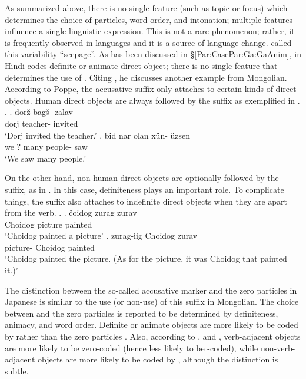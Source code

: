 As summarized above,
there is no single feature (such as topic or focus) which determines
the choice of particles, word order, and intonation;
multiple features influence a single linguistic expression.
This is not a rare phenomenon;
rather, it is frequently observed in languages and
it is a source of language change.
 called this variability ``seepage''.
As has been discussed in \S \ref{Par:CasePar:Ga:GaAnim},
 in Hindi codes definite or animate direct object;
there is no single feature that determines the use of .
Citing \cite{poppe70}, he discusses another example from Mongolian.
According to Poppe, the accusative suffix  only attaches to certain kinds of direct objects.
Human direct objects are always followed by the suffix as exemplified in
\Next.
%
\ex.\label{Disc:Ex:Mongolian1}
 \ag. dor\v{z} bag\v{s}- zalav \\
	dorj teacher-{} invited \\
	`Dorj invited the teacher.'
 \bg. bid nar olan x\"{u}n- \"{u}zsen \\
	we ? many people-{} saw \\
	`We saw many people.'
	\hfill{\cite[18]{comrie79}}

On the other hand, non-human direct objects are optionally followed by the suffix, as in \Next.
In this case,
definiteness plays an important role.
To complicate things,
the suffix also attaches to indefinite direct objects
when they are apart from the verb.
%
\ex.\label{Disc:Ex:Mongolian2}
 \ag. \v{c}oidog zurag zurav \\
	Choidog picture painted \\
	`Choidog painted a picture'
 \bg. zurag-iig Choidog zurav \\
	picture- Choidog painted \\
	`Choidog painted the picture. (As for the picture, it was Choidog that painted it.)'
	\hfill{\cite[19]{comrie79}}

The distinction between the so-called accusative marker  and the zero particles in Japanese is similar to the use (or non-use) of this suffix  in Mongolian.
The choice between  and the zero particles is reported to be determined by definiteness, animacy, and word order.
Definite or animate objects are more likely to be coded by 
rather than the zero particles \cite{minashima01,fry01,kurumadajaeger13,kurumadajaeger15}.
Also,
according to , and ,
verb-adjacent objects are more likely to be zero-coded (hence less likely to be -coded),
while non-verb-adjacent objects are more likely to be coded by ,
although the distinction is subtle.


